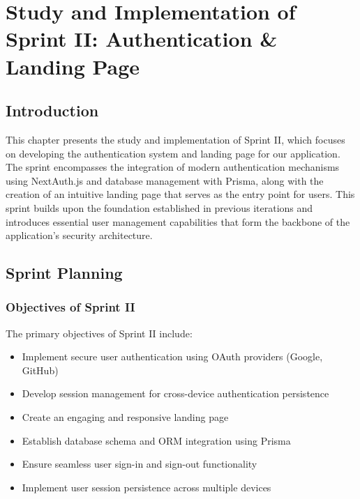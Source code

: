 \chapter[Sprint II]{Study and Implementation of Sprint II: Authentication \& Landing Page}


\section{Introduction}
This chapter presents the study and implementation of Sprint II, which focuses on developing the authentication system and landing page for our application. The sprint encompasses the integration of modern authentication mechanisms using NextAuth.js and database management with Prisma, along with the creation of an intuitive landing page that serves as the entry point for users. This sprint builds upon the foundation established in previous iterations and introduces essential user management capabilities that form the backbone of the application's security architecture.

\section{Sprint Planning}

\subsection{Objectives of Sprint II}
The primary objectives of Sprint II include:
\begin{itemize}
    \item Implement secure user authentication using OAuth providers (Google, GitHub)
    \item Develop session management for cross-device authentication persistence
    \item Create an engaging and responsive landing page
    \item Establish database schema and ORM integration using Prisma
    \item Ensure seamless user sign-in and sign-out functionality
    \item Implement user session persistence across multiple devices
\end{itemize}

